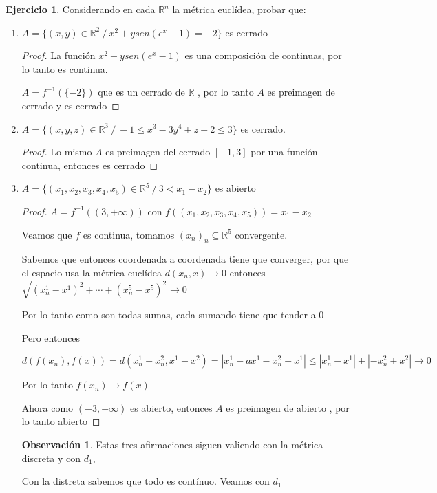 \documentclass[11pt]{report}
\newcommand{\R}{\mathbb{R}}
\newcommand{\ra}{\rightarrow}
\theoremstyle{definition}
\newtheorem*{remark}{Observación}
\newtheorem{ej}{Ejercicio}
\begin{document}
	\begin{ej}
		Considerando en cada $\R^n$ la métrica euclídea, probar que:
		\begin{enumerate}
			\item $A= \{(x,y)\in\R^2 \ / \ x^2+ysen(e^x -1) = -2\}$ es cerrado
				\begin{proof}
					La función $x^2 + ysen(e^x -1)$ es una composición de continuas, por lo tanto es continua.

					$A = f^{-1}(\{-2\})$ que es un cerrado de $\R$  , por lo tanto $A$ es preimagen de cerrado y es cerrado

				\end{proof}
			\item $A = \{(x,y,z) \in \R^3 \ / \ -1 \leq x^3 - 3y^4 + z -2 \leq 3\}$ es cerrado.
				\begin{proof}
					Lo mismo $A$ es preimagen del cerrado $[-1,3]$ por una función continua, entonces es cerrado
				\end{proof}
				
			\item $A = \{(x_1,x_2,x_3,x_4,x_5) \in \R^5 \ / \ 3 < x_1 - x_2\}$ es abierto
				\begin{proof}
					$A = f^{-1}((3,+\infty))$ con $f((x_1,x_2,x_3,x_4,x_5)) = x_1 -x_2$

					Veamos que $f$ es continua, tomamos $(x_n)_n \subseteq \R^5$ convergente.

					Sabemos que entonces coordenada a coordenada tiene que converger, por que el espacio usa la métrica euclídea 
					$d(x_n,x) \ra 0$ entonces $\sqrt{(x^1_n - x^1)^2+ \cdots + (x^5_n - x^5)^2} \ra 0$

					Por lo tanto como son todas sumas, cada sumando tiene que tender a 0

					Pero entonces 

					$$d(f(x_n),f(x)) = d(x^1_n - x^2_n , x^1 -x^2) = |x^1_n -a x^1 -x_n^2 + x^1| \leq |x^1_n -x^1| + |-x_n^2 + x^2| \ra 0$$

					Por lo tanto $f(x_n) \ra f(x)$

					Ahora como $(-3,+\infty)$ es abierto, entonces $A$ es preimagen de abierto , por lo tanto abierto

				\end{proof}
				\begin{remark} Estas tres afirmaciones siguen valiendo con la métrica discreta y con $d_1$, 

				Con la distreta sabemos que todo es contínuo. Veamos con $d_1$


\end{remark}
\end{enumerate}
\end{ej}
\end{document}
